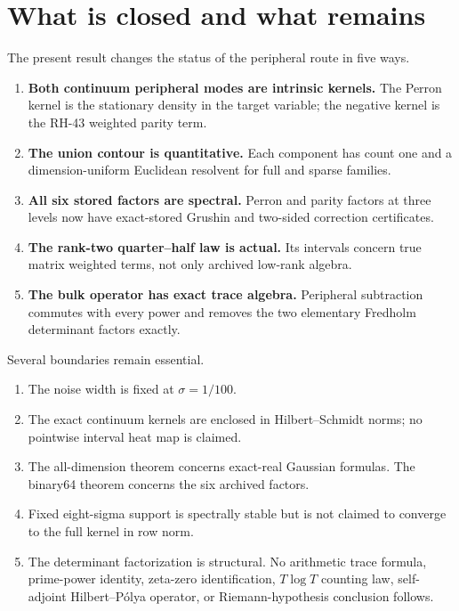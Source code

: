 \documentclass[11pt]{article}
\theoremstyle{definition}
\theoremstyle{remark}
\begin{document}
\section{What is closed and what remains}
\label{sec:boundary}

The present result changes the status of the peripheral route in five ways.
\begin{enumerate}[leftmargin=2em]
 \item \textbf{Both continuum peripheral modes are intrinsic kernels.}
       The Perron kernel is the stationary density in the target variable;
       the negative kernel is the RH-43 weighted parity term.
 \item \textbf{The union contour is quantitative.}
       Each component has count one and a dimension-uniform Euclidean
       resolvent for full and sparse families.
 \item \textbf{All six stored factors are spectral.}
       Perron and parity factors at three levels now have exact-stored
       Grushin and two-sided correction certificates.
 \item \textbf{The rank-two quarter--half law is actual.}
       Its intervals concern true matrix weighted terms, not only archived
       low-rank algebra.
 \item \textbf{The bulk operator has exact trace algebra.}
       Peripheral subtraction commutes with every power and removes the two
       elementary Fredholm determinant factors exactly.
\end{enumerate}

Several boundaries remain essential.
\begin{enumerate}[leftmargin=2em]
 \item The noise width is fixed at $\sigma=1/100$.
 \item The exact continuum kernels are enclosed in Hilbert--Schmidt norms;
       no pointwise interval heat map is claimed.
 \item The all-dimension theorem concerns exact-real Gaussian formulas.  The
       binary64 theorem concerns the six archived factors.
 \item Fixed eight-sigma support is spectrally stable but is not claimed to
       converge to the full kernel in row norm.
 \item The determinant factorization is structural.  No arithmetic trace
       formula, prime-power identity, zeta-zero identification, $T\log T$
       counting law, self-adjoint Hilbert--P\'olya operator, or
       Riemann-hypothesis conclusion follows.
\end{enumerate}
\end{document}
